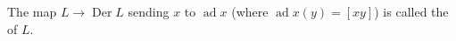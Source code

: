 The map $L \to \operatorname{Der} L$ sending $x$ to $\operatorname{ad} x$ (where $\operatorname{ad} x(y) = [xy]$) is called the  of $L$.
